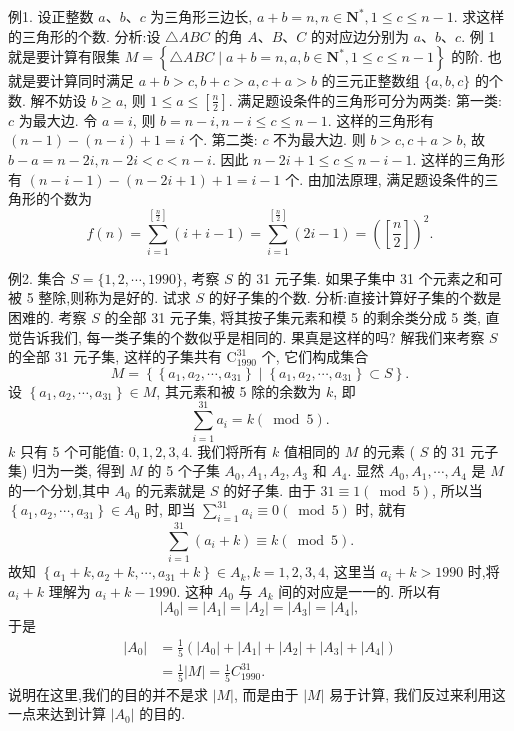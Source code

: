 例1. 设正整数 $a 、 b 、 c$ 为三角形三边长, $a+b=n, n \in \mathbf{N}^*, 1 \leqslant c \leqslant n-1$. 求这样的三角形的个数.
分析:设 $\triangle A B C$ 的角 $A 、 B 、 C$ 的对应边分别为 $a 、 b 、 c$. 例 1 就是要计算有限集 $M=\left\{\triangle A B C \mid a+b=n, a, b \in \mathbf{N}^*, 1 \leqslant c \leqslant n-1\right\}$ 的阶.
也就是要计算同时满足 $a+b>c, b+c>a, c+a>b$ 的三元正整数组 $\{a, b, c\}$ 的个数.
解不妨设 $b \geqslant a$, 则 $1 \leqslant a \leqslant\left[\frac{n}{2}\right]$. 满足题设条件的三角形可分为两类:
第一类: $c$ 为最大边.
令 $a=i$, 则 $b=n-i, n-i \leqslant c \leqslant n-1$. 这样的三角形有 $(n-1)-(n-i)+1=i$ 个.
第二类: $c$ 不为最大边.
则 $b>c, c+a>b$, 故 $b-a=n-2 i, n-2 i< c<n-i$. 因此 $n-2 i+1 \leqslant c \leqslant n-i-1$. 这样的三角形有 $(n-i-1)- (n-2 i+1)+1=i-1$ 个.
由加法原理, 满足题设条件的三角形的个数为
$$
f(n)=\sum_{i=1}^{\left[\frac{n}{2}\right]}(i+i-1)=\sum_{i=1}^{\left[\frac{n}{2}\right]}(2 i-1)=\left(\left[\frac{n}{2}\right]\right)^2 .
$$



例2. 集合 $S=\{1,2, \cdots, 1990\}$, 考察 $S$ 的 31 元子集.
如果子集中 31 个元素之和可被 5 整除,则称为是好的.
试求 $S$ 的好子集的个数.
分析:直接计算好子集的个数是困难的.
考察 $S$ 的全部 31 元子集, 将其按子集元素和模 5 的剩余类分成 5 类, 直觉告诉我们, 每一类子集的个数似乎是相同的.
果真是这样的吗?
解我们来考察 $S$ 的全部 31 元子集, 这样的子集共有 $\mathrm{C}_{1990}^{31}$ 个, 它们构成集合
$$
M=\left\{\left\{a_1, a_2, \cdots, a_{31}\right\} \mid\left\{a_1, a_2, \cdots, a_{31}\right\} \subset S\right\} .
$$
设 $\left\{a_1, a_2, \cdots, a_{31}\right\} \in M$, 其元素和被 5 除的余数为 $k$, 即
$$
\sum_{i=1}^{31} a_i=k(\bmod 5) .
$$
$k$ 只有 5 个可能值: $0,1,2,3,4$. 我们将所有 $k$ 值相同的 $M$ 的元素 ( $S$ 的 31 元子集) 归为一类, 得到 $M$ 的 5 个子集 $A_0, A_1, A_2, A_3$ 和 $A_4$. 显然 $A_0, A_1, \cdots, A_4$ 是 $M$ 的一个分划,其中 $A_0$ 的元素就是 $S$ 的好子集.
由于 $31 \equiv 1(\bmod 5)$, 所以当 $\left\{a_1, a_2, \cdots, a_{31}\right\} \in A_0$ 时, 即当 $\sum_{i=1}^{31} a_i \equiv 0(\bmod 5)$ 时, 就有
$$
\sum_{i=1}^{31}\left(a_i+k\right) \equiv k(\bmod 5) .
$$
故知 $\left\{a_1+k, a_2+k, \cdots, a_{31}+k\right\} \in A_k, k=1,2,3,4$, 这里当 $a_i+k>1990$ 时,将 $a_i+k$ 理解为 $a_i+k-1990$. 这种 $A_0$ 与 $A_k$ 间的对应是一一的.
所以有
$$
\left|A_0\right|=\left|A_1\right|=\left|A_2\right|=\left|A_3\right|=\left|A_4\right|,
$$
于是
$$
\begin{aligned}
\left|A_0\right| & =\frac{1}{5}\left(\left|A_0\right|+\left|A_1\right|+\left|A_2\right|+\left|A_3\right|+\left|A_4\right|\right) \\
& =\frac{1}{5}|M|=\frac{1}{5} C_{1990}^{31} .
\end{aligned}
$$
说明在这里,我们的目的并不是求 $|M|$, 而是由于 $|M|$ 易于计算, 我们反过来利用这一点来达到计算 $\left|A_0\right|$ 的目的.



